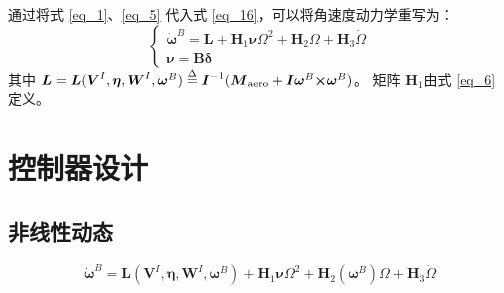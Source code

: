 通过将式 \eqref{eq_1}、\eqref{eq_5} 代入式 \eqref{eq_16}，可以将角速度动力学重写为：
\begin{equation}
	\left\{ \begin{array}{l}
	{{{\boldsymbol{\dot \omega }}}^B} = {\boldsymbol{L}} + {{\boldsymbol{H}}_1}{\boldsymbol{\nu }}{\Omega ^2} + {{\boldsymbol{H}}_2}\Omega  + {{\boldsymbol{H}}_3}\dot \Omega \\
	{\boldsymbol{\nu }} = {\boldsymbol{B\delta }}
	\end{array} \right.
	\label{eq_17}
\end{equation}
其中 ${\boldsymbol{L}} = {\boldsymbol{L}}({{\boldsymbol{V}}^I},{\boldsymbol{\eta}},{{\boldsymbol{W}}^I} ,{{\boldsymbol{\omega }}^B}) \buildrel \Delta \over = {{\boldsymbol{I}}^{ - 1}}({{\boldsymbol{M}}_\text{aero}} + {\boldsymbol{I}}{{\boldsymbol{\omega }}^B}{\boldsymbol{ \times }}{{\boldsymbol{\omega }}^B})$。 矩阵 ${{\boldsymbol{H}}_{1}}$由式 \eqref{eq_6}  定义。

\section{控制器设计}

\subsection{非线性动态}

\begin{equation}
	{{\boldsymbol{\dot \omega }}^B} = {\boldsymbol{L}}({{\boldsymbol{V}}^I},{\boldsymbol{\eta }},{{\boldsymbol{W}}^I},{{\boldsymbol{\omega }}^B}) + {{\boldsymbol{H}}_1}{\boldsymbol{\nu }}{\Omega ^2} + {{\boldsymbol{H}}_2}({{\boldsymbol{\omega }}^B})\Omega  + {{\boldsymbol{H}}_3}\dot \Omega
	\label{eq_18}
\end{equation}

